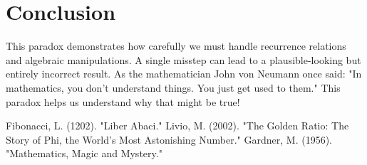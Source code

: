 \documentclass{article}
\begin{document}
\section{Conclusion}

This paradox demonstrates how carefully we must handle recurrence relations and algebraic manipulations. A single misstep can lead to a plausible-looking but entirely incorrect result. As the mathematician John von Neumann once said: "In mathematics, you don't understand things. You just get used to them." This paradox helps us understand why that might be true!

\begin{thebibliography}{9}
     Fibonacci, L. (1202). "Liber Abaci."
     Livio, M. (2002). "The Golden Ratio: The Story of Phi, the World's Most Astonishing Number."
     Gardner, M. (1956). "Mathematics, Magic and Mystery."
\end{thebibliography}
\end{document}
